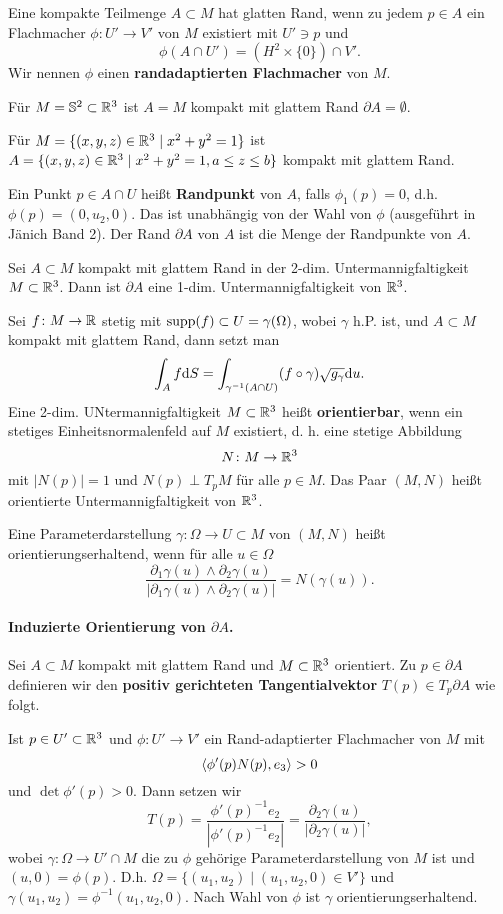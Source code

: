 Eine kompakte Teilmenge $A \subset M$ hat glatten Rand, wenn zu jedem $p \in A$ ein Flachmacher $\phi \colon U' \to V'$ von $M$ existiert mit $U' \ni p$ und 
\[\phi(A \cap U') = (H^2 \times \{0\}) \cap V'.\]
Wir nennen $\phi$ einen \textbf{randadaptierten Flachmacher} von $M$.
\begin{beispiel}
	Für $M = \mathbb{S}^2 \subset \mathbb{R}^3$ ist $A = M$ kompakt mit glattem Rand $\partial A = \emptyset$.
	
	Für $M = \{(x,y,z) \in \mathbb{R}^3 \mid x^2 + y^2 = 1\}$ ist $A = \{(x,y,z) \in \mathbb{R}^3 \mid x^2 + y^2 = 1, a \leq z \leq b\}$ kompakt mit glattem Rand.
\end{beispiel} 
Ein Punkt $p \in A \cap U$ heißt \textbf{Randpunkt} von $A$, falls $\phi_1(p) = 0$, d.h. $\phi(p) = (0,u_2,0)$. Das ist unabhängig von der Wahl von $\phi$ (ausgeführt in Jänich Band 2). Der Rand $\partial A$ von $A$ ist die Menge der Randpunkte von $A$.
\begin{satz}\label{satz3_28}
	Sei $A \subset M$ kompakt mit glattem Rand in der 2-dim. Untermannigfaltigkeit $M \subset \mathbb{R}^3$. Dann ist $\partial A$ eine 1-dim. Untermannigfaltigkeit von $\mathbb{R}^3$.
\end{satz}
Sei $f \colon M \to \mathbb{R}$ stetig mit $\mathrm{supp}(f) \subset U = \gamma(\Omega)$, wobei $\gamma$ h.P. ist, und $A \subset M$ kompakt mit glattem Rand, dann setzt man 
\[\int_Af \mathrm{d} S = \int_{\gamma^{-1}(A \cap U)} (f \circ \gamma)\sqrt{g_\gamma} \mathrm{d} u.\]
Eine 2-dim. UNtermannigfaltigkeit $M \subset \mathbb{R}^3$ heißt \textbf{orientierbar}, wenn ein stetiges Einheitsnormalenfeld auf $M$ existiert, d. h. eine stetige Abbildung
\[N \colon M \to \mathbb{R}^3\]
mit $|N(p)| = 1$ und $N(p) \perp T_pM$ für alle $p \in M$. Das Paar $(M,N)$ heißt orientierte Untermannigfaltigkeit von $\mathbb{R}^3$.

Eine Parameterdarstellung $\gamma \colon \Omega \to U \subset M$ von $(M,N)$ heißt orientierungserhaltend, wenn für alle $u \in \Omega$
\[\frac{\partial_1 \gamma(u) \wedge \partial_2 \gamma(u)}{|\partial_1 \gamma(u) \wedge \partial_2 \gamma(u)|} = N(\gamma(u)).\]
\paragraph{Induzierte Orientierung von $\partial A$. } Sei $A \subset M$ kompakt mit glattem Rand und $M \subset \mathbb{R}^3$ orientiert. Zu $p \in \partial A$ definieren wir den \textbf{positiv gerichteten Tangentialvektor} $T(p) \in T_p \partial A$ wie folgt.

Ist $p \in U' \subset \mathbb{R}^3$ und $\phi \colon U' \to V'$ ein Rand-adaptierter Flachmacher von $M$ mit
\[\left\langle\phi'(p)N(p),e_3 \right\rangle > 0\]
und $\det \phi'(p) > 0$. Dann setzen wir
\[T(p) = \frac{\phi'(p)^{-1} e_2}{|\phi'(p)^{-1} e_2|} = \frac{\partial_2 \gamma(u)}{|\partial_2 \gamma(u)|},\]
wobei $\gamma \colon \Omega \to U' \cap M$ die zu $\phi$ gehörige Parameterdarstellung von $M$ ist und $(u,0) = \phi(p)$. D.h. $\Omega = \{(u_1, u_2) \mid (u_1,u_2,0) \in V'\}$ und $\gamma(u_1, u_2) = \phi^{-1}(u_1, u_2,0)$. Nach Wahl von $\phi$ ist $\gamma$ orientierungserhaltend.
